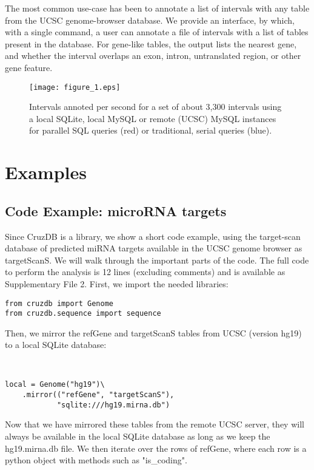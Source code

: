 \documentclass{bioinfo}
\begin{document}
\begin{methods}
The most common use-case has been to annotate a list of intervals with any table from the UCSC genome-browser database. We provide an interface, by which, with a single command, a user can annotate a file of intervals with a list of tables present in the database. For gene-like tables, the output lists the nearest gene, and whether the interval overlaps an exon, intron, untranslated region, or other gene feature.

\begin{figure}[!tpb]%
\centerline{\texttt{[image: figure\_1.eps]}}
\caption{Intervals annoted per second for a set of about 3,300 intervals using a local SQLite,
local MySQL or remote (UCSC) MySQL instances for parallel SQL queries (red) or traditional, 
serial queries (blue).
}\label{fig:01}
\end{figure}
\end{methods}

\section{Examples}


\subsection{Code Example: microRNA targets}

Since CruzDB is a library, we show a short code example, using the target-scan database of predicted miRNA targets \citep{Grimson} available in the UCSC genome browser as targetScanS. We will walk through the important parts of the code. The full code to perform the analysis is 12 lines (excluding comments) and is available as Supplementary File 2. First, we import the needed libraries:

\begin{verbatim}
from cruzdb import Genome
from cruzdb.sequence import sequence
\end{verbatim}

Then, we mirror the refGene and targetScanS tables from UCSC (version hg19) to a local SQLite database:
\begin{verbatim}


local = Genome("hg19")\
    .mirror(("refGene", "targetScanS"),
            "sqlite:///hg19.mirna.db")
\end{verbatim}

Now that we have mirrored these tables from the remote UCSC server, they will always be available in the local SQLite database as long as we keep the hg19.mirna.db file. We then iterate over the rows of refGene, where each row is a python object with methods such as "is\_coding".
\end{document}
